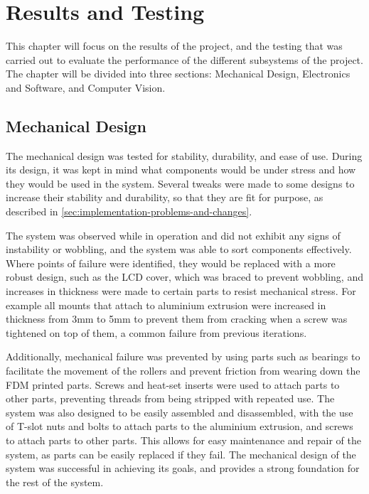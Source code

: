 \section{Results and Testing}
\label{sec:results-and-testing}
This chapter will focus on the results of the project, and the testing that was carried out to evaluate the performance of the different subsystems of the project. The chapter will be divided into three sections: Mechanical Design, Electronics and Software, and Computer Vision.

\subsection{Mechanical Design}
\label{sec:mechanical-design-evaluation}
The mechanical design was tested for stability, durability, and ease of use. During its design, it was kept in mind what components would be under stress and how they would be used in the system. Several tweaks were made to some designs to increase their stability and durability, so that they are fit for purpose, as described in \autoref{sec:implementation-problems-and-changes}. 

The system was observed while in operation and did not exhibit any signs of instability or wobbling, and the system was able to sort components effectively. Where points of failure were identified, they would be replaced with a more robust design, such as the LCD cover, which was braced to prevent wobbling, and increases in thickness were made to certain parts to resist mechanical stress. For example all mounts that attach to aluminium extrusion were increased in thickness from 3mm to 5mm to prevent them from cracking when a screw was tightened on top of them, a common failure from previous iterations.

Additionally, mechanical failure was prevented by using parts such as bearings to facilitate the movement of the rollers and prevent friction from wearing down the FDM printed parts. Screws and heat-set inserts were used to attach parts to other parts, preventing threads from being stripped with repeated use. The system was also designed to be easily assembled and disassembled, with the use of T-slot nuts and bolts to attach parts to the aluminium extrusion, and screws to attach parts to other parts. This allows for easy maintenance and repair of the system, as parts can be easily replaced if they fail. The mechanical design of the system was successful in achieving its goals, and provides a strong foundation for the rest of the system.

